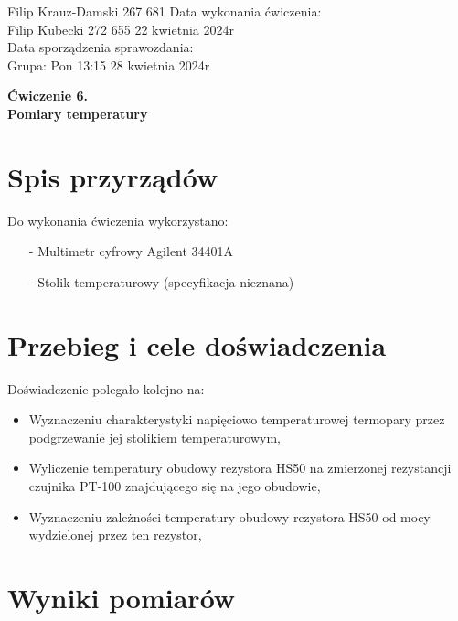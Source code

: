 \documentclass[11pt]{article}
\begin{document}
    \begin{flushleft}
        Filip Krauz-Damski 267 681 \hfill Data wykonania ćwiczenia:\\
        Filip Kubecki 272 655 \hfill 22 kwietnia 2024r\\
        \hfill Data sporządzenia sprawozdania:\\
        Grupa: Pon 13:15 \hfill 28 kwietnia 2024r\\
    \end{flushleft}
    \begin{center}
        \Large\textbf{Ćwiczenie 6.}\\
        \textbf{Pomiary temperatury}
    \end{center}
    \vspace{2cm}
    \section{Spis przyrządów}
    \par{
        Do wykonania ćwiczenia wykorzystano:
        \begin{itemize}
            \setlength\itemsep{0em}
            \item[-] Multimetr cyfrowy Agilent 34401A
            \item[-] Stolik temperaturowy (specyfikacja nieznana)
        \end{itemize}
    }
    
    \section{Przebieg i cele doświadczenia}
    Doświadczenie polegało kolejno na:
    \begin{itemize}
        \setlength\itemsep{0em}
        \item Wyznaczeniu charakterystyki napięciowo temperaturowej termopary przez podgrzewanie jej stolikiem temperaturowym,
        \item Wyliczenie temperatury obudowy rezystora HS50 na zmierzonej rezystancji czujnika PT-100 znajdującego się na jego obudowie,
        \item Wyznaczeniu zależności temperatury obudowy rezystora HS50 od mocy wydzielonej przez ten rezystor,
    \end{itemize}

    \section{Wyniki pomiarów}
\end{document}
